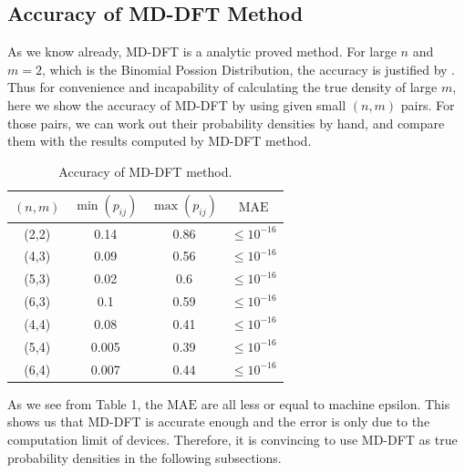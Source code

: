 \documentclass[12pt]{article}
\begin{document}
\subsection{Accuracy of MD-DFT Method}
As we know already, MD-DFT is a analytic proved method. For large $n$ and $m=2$, which is the Binomial Possion Distribution, the accuracy is justified by . Thus for convenience and incapability of calculating the true density of large $m$, here we show the accuracy of MD-DFT by using given small $(n,m)$ pairs. For those pairs, we can work out their probability densities by hand, and compare them with the results computed by MD-DFT method.
\begin{table}%
\centering
\caption{Accuracy of MD-DFT method.}\label{tab:my_label}
\vspace{1ex}
\begin{tabular}{c|c|c|c}
\hline\hline
     $(n,m)$ & $\min (p_{i j})$ & $\max (p_{i j})$ & $\mathrm{MAE}$ \\
\hline
    (2,2) & 0.14 & 0.86 & $\leq 10^{-16}$\\
\hline
    (4,3) &0.09 &0.56 & $\leq 10^{-16}$\\
\hline
    (5,3) &0.02 &0.6 &$\leq 10^{-16}$\\
\hline
    (6,3) &0.1 &0.59 &$\leq 10^{-16}$\\
\hline
    (4,4) &0.08 &0.41 &$\leq 10^{-16}$\\
\hline
    (5,4) &0.005 &0.39 &$\leq 10^{-16}$\\
\hline
    (6,4) &0.007 &0.44 &$\leq 10^{-16}$\\
\hline\hline
\end{tabular}

\end{table}
As we see from Table 1, the $\mathrm{MAE}$ are all less or equal to machine epsilon. This shows us that MD-DFT is accurate enough and the error is only due to the computation limit of devices. Therefore, it is convincing to use MD-DFT as true probability densities in the following subsections.
\end{document}
